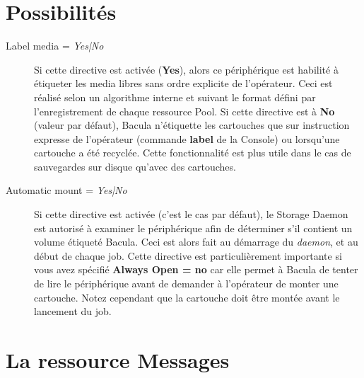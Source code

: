 \label{AutochangerRes}
\label{AutochangerResource1}



\section{Possibilit\'es}

\begin{description}

\item [Label media = {\it Yes|No}]
   Si cette directive est activ\'ee ({\bf Yes}), alors ce p\'eriph\'erique est 
   habilit\'e \`a \'etiqueter les media libres sans ordre explicite de l'op\'erateur. 
   Ceci est r\'ealis\'e selon un algorithme interne et suivant le format 
   d\'efini par l'enregistrement  de chaque 
   ressource Pool. Si cette directive est \`a {\bf No} (valeur par d\'efaut), 
   Bacula n'\'etiquette les cartouches que sur instruction expresse de 
   l'op\'erateur (commande {\bf label} de la Console) ou lorsqu'une cartouche 
   a \'et\'e recycl\'ee. Cette fonctionnalit\'e est plus utile dans le cas de sauvegardes 
   sur disque qu'avec des cartouches.

\item [Automatic mount = {\it Yes|No}]
   Si cette directive est activ\'ee (c'est le cas par d\'efaut), le Storage Daemon 
   est autoris\'e \`a examiner le p\'eriph\'erique afin de d\'eterminer s'il contient 
   un volume \'etiquet\'e Bacula. Ceci est alors fait au d\'emarrage du {\it daemon}, 
   et au d\'ebut de chaque job. Cette directive est particuli\`erement importante 
   si vous avez sp\'ecifi\'e  {\bf Always Open = no}  car elle permet \`a 
   Bacula de tenter de lire le p\'eriph\'erique avant de demander \`a l'op\'erateur 
   de monter une cartouche. Notez cependant que la cartouche doit \^etre 
   mont\'ee avant le lancement du job.

\end{description}

\section{La ressource Messages}
\label{MessagesResource1}

